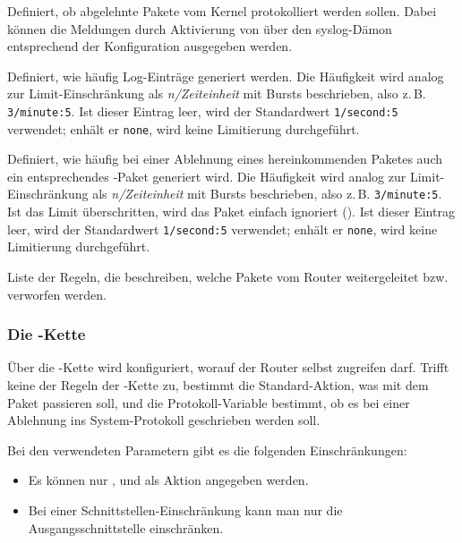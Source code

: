 \begin{description}
Definiert, ob abgelehnte Pakete vom Kernel protokolliert werden sollen.
Dabei können die Meldungen durch Aktivierung von  über den
syslog-Dämon entsprechend der Konfiguration ausgegeben werden.

Definiert, wie häufig Log-Einträge generiert werden. Die Häufigkeit
wird analog zur Limit-Einschränkung als \emph{n/Zeiteinheit} mit Bursts
beschrieben, also z.\,B. \texttt{3/minute:5}. Ist dieser Eintrag leer, wird der
Standardwert \texttt{1/second:5} verwendet; enhält er \texttt{none}, wird keine
Limitierung durchgeführt.

Definiert, wie häufig bei einer Ablehnung eines hereinkommenden Paketes
auch ein entsprechendes -Paket generiert wird. Die Häufigkeit
wird analog zur Limit-Einschränkung als \emph{n/Zeiteinheit} mit Bursts
beschrieben, also z.\,B. \texttt{3/minute:5}. Ist das Limit überschritten, wird
das Paket einfach ignoriert (). Ist dieser Eintrag leer, wird
der Standardwert \texttt{1/second:5} verwendet; enhält er \texttt{none}, wird
keine Limitierung durchgeführt.

Liste der Regeln, die beschreiben, welche Pakete vom Router
weitergeleitet bzw. verworfen werden.
\end{description}

\subsubsection{Die -Kette}

Über die -Kette wird konfiguriert, worauf der Router selbst
zugreifen darf. Trifft keine der Regeln der -Kette zu, bestimmt
die Standard-Aktion, was mit dem Paket passieren soll, und die
Protokoll-Variable bestimmt, ob es bei einer Ablehnung ins System-Protokoll
geschrieben werden soll.

Bei den verwendeten Parametern gibt es die folgenden Einschränkungen:
\begin{itemize}
  \item Es können nur ,  und 
    als Aktion angegeben werden.
  \item Bei einer Schnittstellen-Einschränkung kann man nur die
    Ausgangsschnittstelle einschränken.
\end{itemize}

